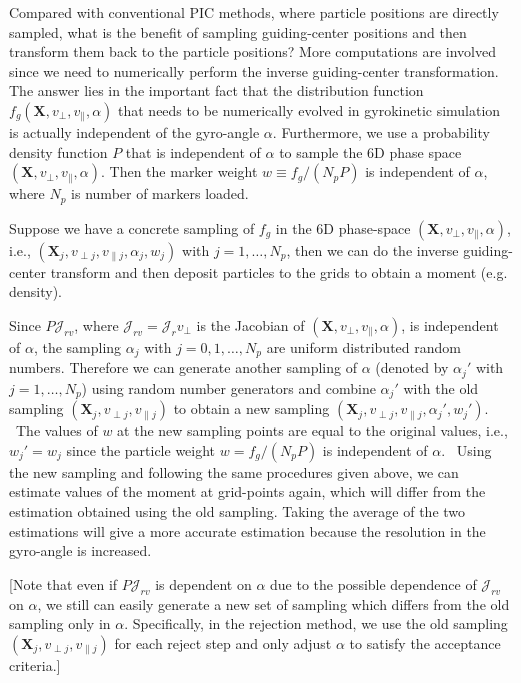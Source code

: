 \documentclass{article}
\begin{document}
Compared with conventional PIC methods, where particle positions are directly
sampled, what is the benefit of sampling guiding-center positions and then
transform them back to the particle positions? More computations are involved
since we need to numerically perform the inverse guiding-center
transformation. The answer lies in the important fact that the distribution
function $f_g (\mathbf{X}, v_{\perp}, v_{\parallel}, \alpha)$ that needs to be
numerically evolved in gyrokinetic simulation is actually independent of the
gyro-angle $\alpha$. Furthermore, we use a probability density function $P$
that is independent of $\alpha$ to sample the 6D phase space $(\mathbf{X},
v_{\perp}, v_{\parallel}, \alpha)$. Then the marker weight $w \equiv f_g /
(N_p P)$ is independent of $\alpha$, where $N_p$ is number of markers loaded.

Suppose we have a concrete sampling of $f_g$ in the 6D phase-space
$(\mathbf{X}, v_{\perp}, v_{\parallel}, \alpha)$, i.e., $(\mathbf{X}_j,
v_{\perp j}, v_{\parallel j}, \alpha_j, w_j)$ with $j = 1, \ldots, N_p$, then
we can do the inverse guiding-center transform and then deposit particles to
the grids to obtain a moment (e.g. density).

Since $P \mathcal{J}_{r v}$, where $\mathcal{J}_{r v} = \mathcal{J}_r
v_{\perp}$ is the Jacobian of $(\mathbf{X}, v_{\perp}, v_{\parallel},
\alpha)$, is independent of $\alpha$, the sampling $\alpha_j$ with $j = 0, 1,
\ldots, N_p$ are uniform distributed random numbers. Therefore we can generate
another sampling of $\alpha$ (denoted by $\alpha_j'$ with $j = 1, \ldots,
N_p$) using random number generators and combine $\alpha_j'$ with the old
sampling $(\mathbf{X}_j, v_{\perp j}, v_{\parallel j})$ to obtain a new
sampling $(\mathbf{X}_j, v_{\perp j}, v_{\parallel j}, \alpha_j', w_j')$. \
The values of $w$ at the new sampling points are equal to the original values,
i.e., $w_j' = w_j$ since the particle weight $w = f_g / (N_p P)$ is
independent of $\alpha$. \ Using the new sampling and following the same
procedures given above, we can estimate values of the moment at grid-points
again, which will differ from the estimation obtained using the old sampling.
Taking the average of the two estimations will give a more accurate estimation
because the resolution in the gyro-angle is increased.

[Note that even if $P \mathcal{J}_{r v}$ is dependent on $\alpha$ due to the
possible dependence of $\mathcal{J}_{r v}$ on $\alpha$, we still can easily
generate a new set of sampling which differs from the old sampling only in
$\alpha$. Specifically, in the rejection method, we use the old sampling
$(\mathbf{X}_j, v_{\perp j}, v_{\parallel j})$ for each reject step and only
adjust $\alpha$ to satisfy the acceptance criteria.]
\end{document}
